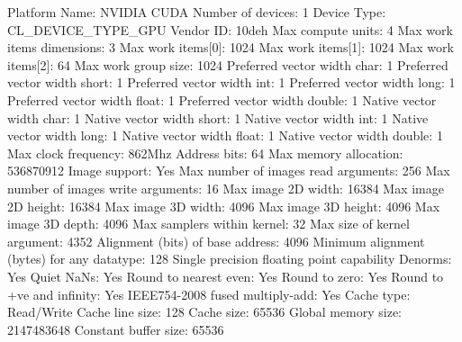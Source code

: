\begin{codebox}[text]
  Platform Name:                                 NVIDIA CUDA
Number of devices:                               1
  Device Type:                                   CL_DEVICE_TYPE_GPU
  Vendor ID:                                     10deh
  Max compute units:                             4
  Max work items dimensions:                     3
    Max work items[0]:                           1024
    Max work items[1]:                           1024
    Max work items[2]:                           64
  Max work group size:                           1024
  Preferred vector width char:                   1
  Preferred vector width short:                  1
  Preferred vector width int:                    1
  Preferred vector width long:                   1
  Preferred vector width float:                  1
  Preferred vector width double:                 1
  Native vector width char:                      1
  Native vector width short:                     1
  Native vector width int:                       1
  Native vector width long:                      1
  Native vector width float:                     1
  Native vector width double:                    1
  Max clock frequency:                           862Mhz
  Address bits:                                  64
  Max memory allocation:                         536870912
  Image support:                                 Yes
  Max number of images read arguments:           256
  Max number of images write arguments:          16
  Max image 2D width:                            16384
  Max image 2D height:                           16384
  Max image 3D width:                            4096
  Max image 3D height:                           4096
  Max image 3D depth:                            4096
  Max samplers within kernel:                    32
  Max size of kernel argument:                   4352
  Alignment (bits) of base address:              4096
  Minimum alignment (bytes) for any datatype:    128
  Single precision floating point capability
    Denorms:                                     Yes
    Quiet NaNs:                                  Yes
    Round to nearest even:                       Yes
    Round to zero:                               Yes
    Round to +ve and infinity:                   Yes
    IEEE754-2008 fused multiply-add:             Yes
  Cache type:                                    Read/Write
  Cache line size:                               128
  Cache size:                                    65536
  Global memory size:                            2147483648
  Constant buffer size:                          65536

\end{codebox}
